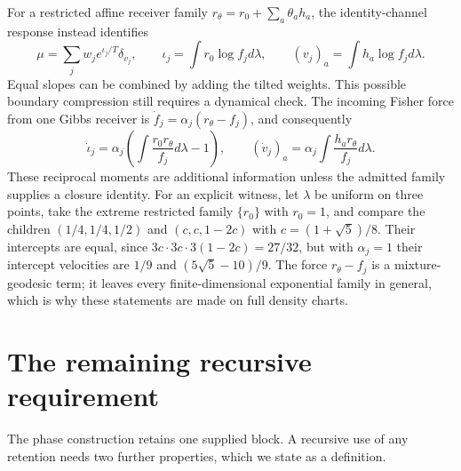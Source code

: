 For a restricted affine receiver family $r_\theta=r_0+\sum_a\theta_a h_a$, the identity-channel response instead identifies
\begin{equation}
 \mu=\sum_jw_j e^{\iota_j/T}\delta_{v_j},\qquad
 \iota_j=\int r_0\log f_j d\lambda,\qquad
 (v_j)_a=\int h_a\log f_j d\lambda.
 \label{eq:public-restricted-descriptor}
\end{equation}
Equal slopes can be combined by adding the tilted weights. This possible boundary compression still requires a dynamical check. The incoming Fisher force from one Gibbs receiver is $\dot f_j=\alpha_j(r_\theta-f_j)$, and consequently
\begin{equation}
 \dot\iota_j=\alpha_j\left(\int\frac{r_0r_\theta}{f_j}d\lambda-1\right),\qquad
 (\dot v_j)_a=\alpha_j\int\frac{h_ar_\theta}{f_j}d\lambda.
 \label{eq:public-restricted-force}
\end{equation}
These reciprocal moments are additional information unless the admitted family supplies a closure identity. For an explicit witness, let $\lambda$ be uniform on three points, take the extreme restricted family $\{r_0\}$ with $r_0=1$, and compare the children $(1/4,1/4,1/2)$ and $(c,c,1-2c)$ with $c=(1+\sqrt5)/8$. Their intercepts are equal, since $3c\cdot3c\cdot3(1-2c)=27/32$, but with $\alpha_j=1$ their intercept velocities are $1/9$ and $(5\sqrt5-10)/9$. The force $r_\theta-f_j$ is a mixture-geodesic term; it leaves every finite-dimensional exponential family in general, which is why these statements are made on full density charts.

\section{The remaining recursive requirement}
\label{sec:public-recursive-requirement}

The phase construction retains one supplied block. A recursive use of any retention needs two further properties, which we state as a definition.

